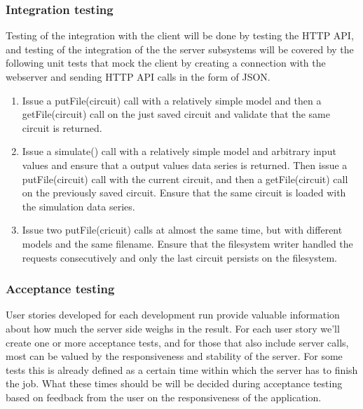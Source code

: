 \subsubsection{Integration testing}
Testing of the integration with the client will be done by testing the HTTP API, and testing of the integration of the the server subsystems will be covered by the following unit tests that mock the client by creating a connection with the webserver and sending HTTP API calls in the form of JSON.

\begin{enumerate}
\item Issue a putFile(circuit) call with a relatively simple model and then a getFile(circuit) call on the just saved circuit and validate that the same circuit is returned.
\item Issue a simulate() call with a relatively simple model and arbitrary input values and ensure that a output values data series is returned. Then issue a putFile(circuit) call with the current circuit, and then a getFile(circuit) call on the previously saved circuit. Ensure that the same circuit is loaded with the simulation data series.
\item Issue two putFile(cricuit) calls at almost the same  time, but with different models and the same filename. Ensure that the filesystem writer handled the requests consecutively and only the last circuit
persists on the filesystem.\end{enumerate}

\subsubsection{Acceptance testing}
User stories developed for each development run provide valuable information about how much the server side weighs in the result. For each user story we'll create one or more acceptance tests, and for those that also include server calls, most can be valued by the responsiveness and stability of the server. For some tests this is already defined as a certain time within which the server has to finish the job. What these times should be will be decided during acceptance testing based on feedback from the user on the responsiveness of the application.
